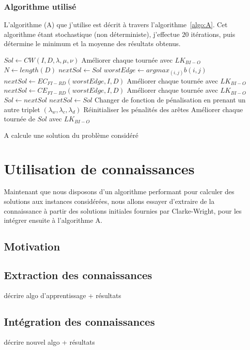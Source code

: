 \documentclass[a4paper,11pt]{article}%
\begin{document}
\subsubsection{Algorithme utilisé}

L'algorithme (A) que j'utilise est décrit à travers l'algorithme~\ref{algo:A}. Cet algorithme étant stochastique (non déterministe), j'effectue $20$ itérations, puis détermine le minimum et la moyenne des résultats obtenus.

\begin{algorithm}
\DontPrintSemicolon %
$Sol \gets CW(I,D,\lambda,\mu,\nu)$\;
Améliorer chaque tournée avec $LK_{BI-O}$\;
$N \gets length(D)$\;
$nextSol \gets Sol$\;
 {
	$worstEdge \gets argmax_{(i,j)} b(i,j) $\;
	$nextSol \gets EC_{FI-RD}(worstEdge,I,D)$\;
	Améliorer chaque tournée avec $LK_{BI-O}$\;
	$nextSol \gets CE_{FI-RD}(worstEdge,I,D)$\;
	Améliorer chaque tournée avec $LK_{BI-O}$\;
	 {
		$ Sol \gets nextSol$\;
	}
	 {
		$nextSol \gets Sol$\;
	}
	 {
		Changer de fonction de pénalisation en prenant un autre triplet $(\lambda_w,\lambda_c,\lambda_d)$\;
		Réinitialiser les pénalités des arêtes\;
		Améliorer chaque tournée de $Sol$ avec $LK_{BI-O}$\;
	}
}
\;
\caption{{\sc A} calcule une solution du problème considéré}
\label{algo:A}
\end{algorithm}


\section{Utilisation de connaissances}

Maintenant que nous disposons d'un algorithme performant pour calculer des solutions aux instances considérées, nous allons essayer d'extraire de la connaissance à partir des solutions initiales fournies par Clarke-Wright, pour les intégrer ensuite à l'algorithme A.
 
\subsection{Motivation}


\subsection{Extraction des connaissances}
décrire algo d'apprentissage + résultats

\subsection{Intégration des connaissances}
décrire nouvel algo + résultats




\end{document}
